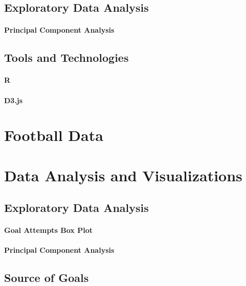 \documentclass[a4paper,11pt]{article}
\begin{document}
\subsection{Exploratory Data Analysis} %

\paragraph{Principal Component Analysis\\}


\subsection{Tools and Technologies} %
\paragraph{R\\} %


\paragraph{D3.js\\} %

\section{Football Data}

\section{Data Analysis and Visualizations}
\subsection{Exploratory Data Analysis}
\paragraph{Goal Attempts Box Plot\\}

\paragraph{Principal Component Analysis\\}

\label{sec:PCA}

\subsection{Source of Goals}

\end{document}
